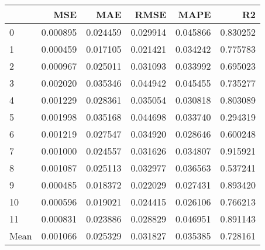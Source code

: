 \begin{tabular}{lrrrrr}
\toprule
 & MSE & MAE & RMSE & MAPE & R2 \\
\midrule
0 & 0.000895 & 0.024459 & 0.029914 & 0.045866 & 0.830252 \\
1 & 0.000459 & 0.017105 & 0.021421 & 0.034242 & 0.775783 \\
2 & 0.000967 & 0.025011 & 0.031093 & 0.033992 & 0.695023 \\
3 & 0.002020 & 0.035346 & 0.044942 & 0.045455 & 0.735277 \\
4 & 0.001229 & 0.028361 & 0.035054 & 0.030818 & 0.803089 \\
5 & 0.001998 & 0.035168 & 0.044698 & 0.033740 & 0.294319 \\
6 & 0.001219 & 0.027547 & 0.034920 & 0.028646 & 0.600248 \\
7 & 0.001000 & 0.024557 & 0.031626 & 0.034807 & 0.915921 \\
8 & 0.001087 & 0.025113 & 0.032977 & 0.036563 & 0.537241 \\
9 & 0.000485 & 0.018372 & 0.022029 & 0.027431 & 0.893420 \\
10 & 0.000596 & 0.019021 & 0.024415 & 0.026106 & 0.766213 \\
11 & 0.000831 & 0.023886 & 0.028829 & 0.046951 & 0.891143 \\
Mean & 0.001066 & 0.025329 & 0.031827 & 0.035385 & 0.728161 \\
\bottomrule
\end{tabular}

